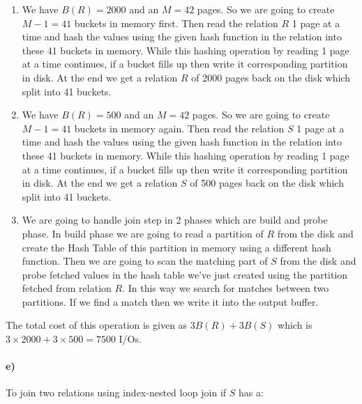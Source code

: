 \documentclass[a4paper,12pt]{article}
\begin{document}
\begin{enumerate}
    \item We have $B(R)=2000$ and an $M=42$ pages. So we are going to create $M-1 = 41$ buckets in memory first. Then read the relation $R$ 1 page at a time and hash the values using the given hash function in the relation into these 41 buckets in memory. While this hashing operation by reading 1 page at a time continues, if a bucket fills up then write it corresponding partition in disk. At the end we get a relation $R$ of 2000 pages back on the disk which split into 41 buckets.
    \item We have $B(R)=500$ and an $M=42$ pages. So we are going to create $M-1 = 41$ buckets in memory again. Then read the relation $S$ 1 page at a time and hash the values using the given hash function in the relation into these 41 buckets in memory. While this hashing operation by reading 1 page at a time continues, if a bucket fills up then write it corresponding partition in disk. At the end we get a relation $S$ of 500 pages back on the disk which split into 41 buckets.
    \item We are going to handle join step in 2 phases which are build and probe phase. In build phase we are going to read a partition of $R$ from the disk and create the Hash Table of this partition in memory using a different hash function. Then we are going to scan the matching part of $S$ from the disk and probe fetched values in the hash table we've just created using the partition fetched from relation $R$. In this way we search for matches between two partitions. If we find a match then we write it into the output buffer. 
\end{enumerate}

The total cost of this operation is given as $3B(R) + 3B(S)$ which is $3\times 2000 + 3\times 500 = 7500$ I/Os.

\paragraph{e)} To join two relations using index-nested loop join if $S$ has a:
\end{document}
